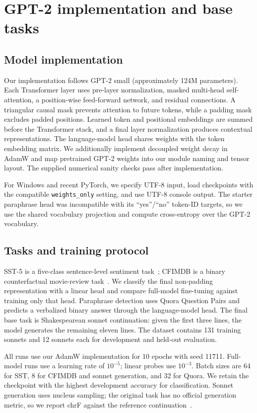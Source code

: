 \documentclass{article}
\begin{document}
\section{GPT-2 implementation and base tasks}

\subsection{Model implementation}

Our implementation follows GPT-2 small (approximately 124M parameters). Each Transformer layer uses pre-layer normalization, masked multi-head self-attention, a position-wise feed-forward network, and residual connections. A triangular causal mask prevents attention to future tokens, while a padding mask excludes padded positions. Learned token and positional embeddings are summed before the Transformer stack, and a final layer normalization produces contextual representations. The language-model head shares weights with the token embedding matrix. We additionally implement decoupled weight decay in AdamW and map pretrained GPT-2 weights into our module naming and tensor layout. The supplied numerical sanity checks pass after implementation.

For Windows and recent PyTorch, we specify UTF-8 input, load checkpoints with the compatible \texttt{weights\_only} setting, and use UTF-8 console output. The starter paraphrase head was incompatible with its ``yes''/``no'' token-ID targets, so we use the shared vocabulary projection and compute cross-entropy over the GPT-2 vocabulary.

\subsection{Tasks and training protocol}

SST-5 is a five-class sentence-level sentiment task~\citep{socher2013recursive}; CFIMDB is a binary counterfactual movie-review task~\citep{kaushik2020learning}. We classify the final non-padding representation with a linear head and compare full-model fine-tuning against training only that head. Paraphrase detection uses Quora Question Pairs and predicts a verbalized binary answer through the language-model head. The final base task is Shakespearean sonnet continuation: given the first three lines, the model generates the remaining eleven lines. The dataset contains 131 training sonnets and 12 sonnets each for development and held-out evaluation.

All runs use our AdamW implementation for 10 epochs with seed 11711. Full-model runs use a learning rate of $10^{-5}$; linear probes use $10^{-3}$. Batch sizes are 64 for SST, 8 for CFIMDB and sonnet generation, and 32 for Quora. We retain the checkpoint with the highest development accuracy for classification. Sonnet generation uses nucleus sampling; the original task has no official generation metric, so we report chrF against the reference continuation~\citep{popovic2015chrf}.
\end{document}
